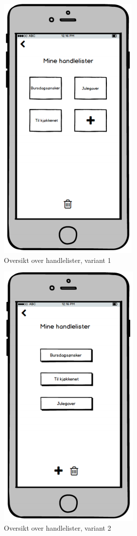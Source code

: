 \begin{figure}[H]
\includegraphics[scale=0.5]{images/prototype1/oversikthandlelister}
\centering %
\caption{Oversikt over handlelister, variant 1}
\label{fig:oversikthandlelister}
\end{figure}

\begin{figure}[H]
\includegraphics[scale=0.5]{images/prototype1/oversikthandlelister2}
\centering %
\caption{Oversikt over handlelister, variant 2}
\label{fig:oversikthandlelister2}
\end{figure}

